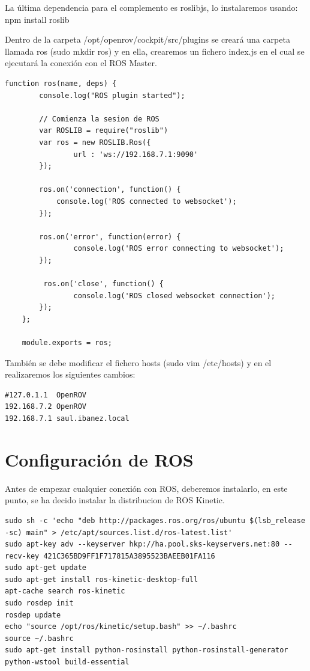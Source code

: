 La última dependencia para el complemento es roslibjs, lo instalaremos usando: npm install roslib

Dentro de la carpeta /opt/openrov/cockpit/src/plugins se creará una carpeta llamada ros (sudo mkdir  ros) y en ella, crearemos un fichero index.js en el cual se ejecutará la conexión con el ROS Master.

\renewcommand{\lstlistingname}{}
\begin{lstlisting}[caption=Conexión con ROS, label={lst:conection_ros}]
function ros(name, deps) {
  		console.log("ROS plugin started");

  		// Comienza la sesion de ROS
 		var ROSLIB = require("roslib")
  		var ros = new ROSLIB.Ros({
    			url : 'ws://192.168.7.1:9090'
  		});

  		ros.on('connection', function() {
   			console.log('ROS connected to websocket');
  		});

  		ros.on('error', function(error) {
    			console.log('ROS error connecting to websocket');
  		});

 		 ros.on('close', function() {
    			console.log('ROS closed websocket connection');
 		});
	};

	module.exports = ros;
\end{lstlisting}

También se debe modificar el fichero hosts (sudo vim /etc/hosts) y en el realizaremos los siguientes cambios:

\begin{lstlisting}[caption=/etc/hosts, label={lst:hosts}]
#127.0.1.1	OpenROV
192.168.7.2	OpenROV
192.168.7.1	saul.ibanez.local
\end{lstlisting}

\section{Configuración de ROS}
\label{cap:Configuracion de ROS}
Antes de empezar cualquier conexión con ROS, deberemos instalarlo, en este punto, se ha decido instalar la distribucion de ROS Kinetic.

\begin{lstlisting}[caption=Instalacion de ROS, label={lst:install_ros}]
sudo sh -c 'echo "deb http://packages.ros.org/ros/ubuntu $(lsb_release -sc) main" > /etc/apt/sources.list.d/ros-latest.list'
sudo apt-key adv --keyserver hkp://ha.pool.sks-keyservers.net:80 --recv-key 421C365BD9FF1F717815A3895523BAEEB01FA116
sudo apt-get update
sudo apt-get install ros-kinetic-desktop-full
apt-cache search ros-kinetic
sudo rosdep init
rosdep update
echo "source /opt/ros/kinetic/setup.bash" >> ~/.bashrc
source ~/.bashrc
sudo apt-get install python-rosinstall python-rosinstall-generator python-wstool build-essential
\end{lstlisting}

